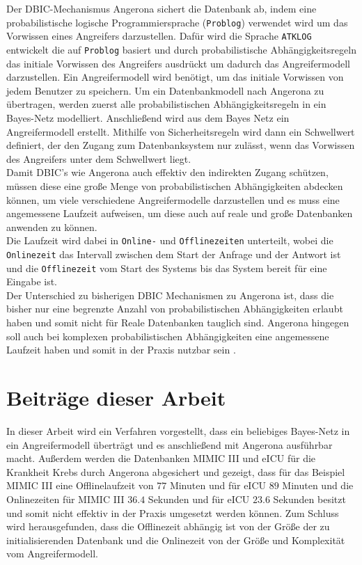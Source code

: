 \documentclass[german,version-2020-11]{uzl-thesis}
\begin{document}
Der DBIC-Mechanismus Angerona sichert die Datenbank ab, indem eine probabilistische logische Programmiersprache (\texttt{Problog}) verwendet wird um das Vorwissen eines Angreifers darzustellen. Dafür wird die Sprache \texttt{ATKLOG} entwickelt die auf \texttt{Problog} basiert und durch probabilistische Abhängigkeitsregeln das initiale Vorwissen des Angreifers ausdrückt um dadurch das Angreifermodell darzustellen. Ein Angreifermodell wird benötigt, um das initiale Vorwissen von jedem Benutzer zu speichern.  Um ein Datenbankmodell nach Angerona zu übertragen, werden zuerst alle probabilistischen Abhängigkeitsregeln in ein Bayes-Netz modelliert. Anschließend wird aus dem Bayes Netz ein Angreifermodell erstellt. Mithilfe von Sicherheitsregeln wird dann ein Schwellwert definiert, der den Zugang zum Datenbanksystem nur zulässt, wenn das Vorwissen des Angreifers unter dem Schwellwert liegt. \\  
Damit DBIC's wie Angerona auch effektiv den indirekten Zugang schützen, müssen diese eine große Menge von probabilistischen Abhängigkeiten abdecken können, um viele verschiedene Angreifermodelle darzustellen und es muss eine angemessene Laufzeit aufweisen, um diese auch auf reale und große Datenbanken anwenden zu können.\\
Die Laufzeit wird dabei in \texttt{Online-} und \texttt{Offlinezeiten} unterteilt, wobei die \texttt{Onlinezeit}  das Intervall zwischen dem Start der Anfrage und der Antwort ist und die \texttt{Offlinezeit}  vom Start des Systems bis das System bereit für eine Eingabe ist. \\
Der Unterschied zu bisherigen DBIC Mechanismen zu Angerona ist, dass die bisher nur eine begrenzte Anzahl von probabilistischen Abhängigkeiten erlaubt haben und somit nicht für Reale Datenbanken tauglich sind. Angerona hingegen soll auch bei komplexen probabilistischen Abhängigkeiten eine angemessene Laufzeit haben und somit in der Praxis nutzbar sein \cite{guarnieri2017securing}. \\

\section{Beiträge dieser Arbeit}
In dieser Arbeit wird ein Verfahren vorgestellt, dass ein beliebiges Bayes-Netz in ein Angreifermodell überträgt und es anschließend mit Angerona ausführbar macht. Außerdem werden die Datenbanken MIMIC III und eICU für die Krankheit Krebs durch Angerona abgesichert und gezeigt, dass für das Beispiel MIMIC III eine Offlinelaufzeit von $77$ Minuten und für eICU $89$ Minuten und die Onlinezeiten für MIMIC III $36.4$ Sekunden und für eICU $23.6$ Sekunden besitzt und somit nicht effektiv in der Praxis umgesetzt werden können. Zum Schluss wird herausgefunden, dass die Offlinezeit abhängig ist von der Größe der zu initialisierenden Datenbank und die Onlinezeit von der Größe und Komplexität vom Angreifermodell.
\end{document}
